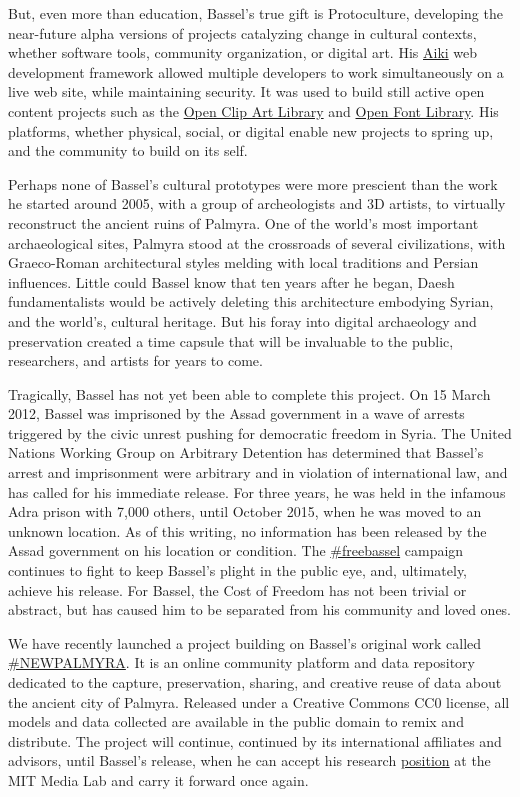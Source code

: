 But, even more than education, Bassel's true gift is Protoculture,
developing the near-future alpha versions of projects catalyzing change
in cultural contexts, whether software tools, community organization, or
digital art. His
\href{https://en.wikipedia.org/wiki/Aiki_Framework}{Aiki} web
development framework allowed multiple developers to work simultaneously
on a live web site, while maintaining security. It was used to build
still active open content projects such as the
\href{https://openclipart.org/}{Open Clip Art Library} and
\href{https://fontlibrary.org/}{Open Font Library}. His platforms,
whether physical, social, or digital enable new projects to spring up,
and the community to build on its self.

Perhaps none of Bassel's cultural prototypes were more prescient than
the work he started around 2005, with a group of archeologists and 3D
artists, to virtually reconstruct the ancient ruins of Palmyra. One of
the world's most important archaeological sites, Palmyra stood at the
crossroads of several civilizations, with Graeco-Roman architectural
styles melding with local traditions and Persian influences. Little
could Bassel know that ten years after he began, Daesh fundamentalists
would be actively deleting this architecture embodying Syrian, and the
world's, cultural heritage. But his foray into digital archaeology and
preservation created a time capsule that will be invaluable to the
public, researchers, and artists for years to come.

Tragically, Bassel has not yet been able to complete this project. On 15
March 2012, Bassel was imprisoned by the Assad government in a wave of
arrests triggered by the civic unrest pushing for democratic freedom in
Syria. The United Nations Working Group on Arbitrary Detention has
determined that Bassel's arrest and imprisonment were arbitrary and in
violation of international law, and has called for his immediate
release. For three years, he was held in the infamous Adra prison with
7,000 others, until October 2015, when he was moved to an unknown
location. As of this writing, no information has been released by the
Assad government on his location or condition. The
\href{http://freebassel.org/}{\#freebassel} campaign continues to fight
to keep Bassel's plight in the public eye, and, ultimately, achieve his
release. For Bassel, the Cost of Freedom has not been trivial or
abstract, but has caused him to be separated from his community and
loved ones.

We have recently launched a project building on Bassel's original work
called \href{http://newpalmyra.org/}{\#NEWPALMYRA}. It is an online
community platform and data repository dedicated to the capture,
preservation, sharing, and creative reuse of data about the ancient city
of Palmyra. Released under a Creative Commons CC0 license, all models
and data collected are available in the public domain to remix and
distribute. The project will continue, continued by its international
affiliates and advisors, until Bassel's release, when he can accept his
research
\href{http://joi.ito.com/weblog/2015/10/22/mit-media-lab-r.html}{position}
at the MIT Media Lab and carry it forward once again.


